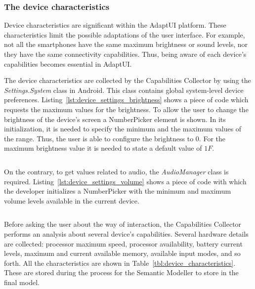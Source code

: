 \subsubsection{The device characteristics}
\label{sec:device_characteristics}

Device characteristics are significant within the AdaptUI platform. These
characteristics limit the possible adaptations of the user interface. For example,
not all the smartphones have the same maximum brightness or sound levels, nor
they have the same connectivity capabilities. Thus, being aware of each device's
capabilities becomes essential in AdaptUI.

The device characteristics are collected by the Capabilities Collector by using
the \textit{Settings.System} class in Android. This class contains global
system-level device preferences. Listing~\ref{lst:device_settings_brightness} 
shows a piece of code which requests the maximum values for the brightness. To 
allow the user to change the brightness of the device's screen a NumberPicker 
element is shown. In its initialization, it is needed to specify the minimum and 
the maximum values of the range. Thus, the user is able to configure the brightness 
to $0$. For the maximum brightness value it is needed to state a default value 
of $1F$.

\inputminted[linenos=true, fontsize=\footnotesize, frame=lines]{java}{4_system_architecture/device_settings_brightness.java}


On the contrary, to get values related to audio, the \textit{AudioManager} class
is required. Listing~\ref{lst:device_settings_volume} shows a piece of code with
which the developer initializes a NumberPicker with the minimum and maximum
volume levels available in the current device.

\inputminted[linenos=true, fontsize=\footnotesize, frame=lines]{java}{4_system_architecture/device_settings_volume.java}


Before asking the user about the way of interaction, the Capabilities Collector
performs an analysis about several device's capabilities. Several hardware
details are collected: processor maximum speed, processor availability, battery
current levels, maximum and current available memory, available input modes, 
and so forth. All the characteristics are shown in Table~\ref{tbl:device_characteristics}. 
These are stored during the process for the Semantic Modeller to store in the 
final model.

